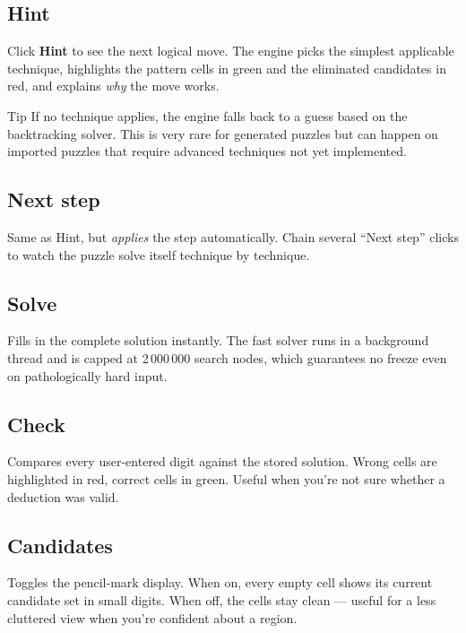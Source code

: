 \subsection{Hint}

Click \textbf{Hint} to see the next logical move. The engine picks the
simplest applicable technique, highlights the pattern cells in green and
the eliminated candidates in red, and explains \emph{why} the move works.

\begin{tipbox}{Tip}
If no technique applies, the engine falls back to a guess based on the
backtracking solver. This is very rare for generated puzzles but can
happen on imported puzzles that require advanced techniques not yet
implemented.
\end{tipbox}

\subsection{Next step}

Same as Hint, but \emph{applies} the step automatically. Chain several
``Next step'' clicks to watch the puzzle solve itself technique by
technique.

\subsection{Solve}

Fills in the complete solution instantly. The fast solver runs in a
background thread and is capped at 2\,000\,000 search nodes, which
guarantees no freeze even on pathologically hard input.

\subsection{Check}

Compares every user-entered digit against the stored solution. Wrong
cells are highlighted in red, correct cells in green. Useful when you're
not sure whether a deduction was valid.

\subsection{Candidates}

Toggles the pencil-mark display. When on, every empty cell shows its
current candidate set in small digits. When off, the cells stay clean
--- useful for a less cluttered view when you're confident about a
region.

